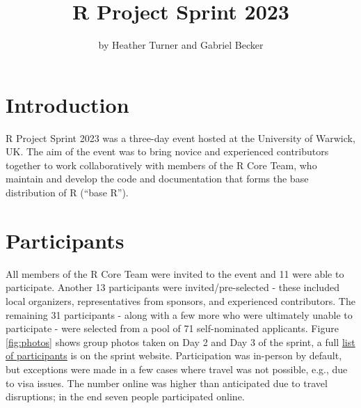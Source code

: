 \title{R Project Sprint 2023}


\author{by Heather Turner and Gabriel Becker}

\maketitle


\hypertarget{introduction}{%
\section{Introduction}\label{introduction}}

R Project Sprint 2023 was a three-day event hosted at the University of Warwick,
UK. The aim of the event was to bring novice and experienced contributors
together to work collaboratively with members of the R Core Team, who
maintain and develop the code and documentation that forms the base
distribution of R (``base R'').

\hypertarget{participants}{%
\section{Participants}\label{participants}}

All members of the R Core Team were invited to the event and 11 were
able to participate. Another 13 participants were invited/pre-selected - these
included local organizers, representatives from sponsors, and experienced
contributors. The remaining 31 participants - along with a few more who were
ultimately unable to participate - were selected from a pool of 71
self-nominated applicants. Figure \ref{fig:photos} shows group photos taken
on Day 2 and Day 3 of the sprint, a full \href{https://contributor.r-project.org/r-project-sprint-2023/participants/}{list of participants} is on the sprint website. Participation was in-person by default,
but exceptions were made in a few cases where travel was not possible, e.g.,
due to visa issues. The number online was higher than anticipated due to
travel disruptions; in the end seven people participated online.

